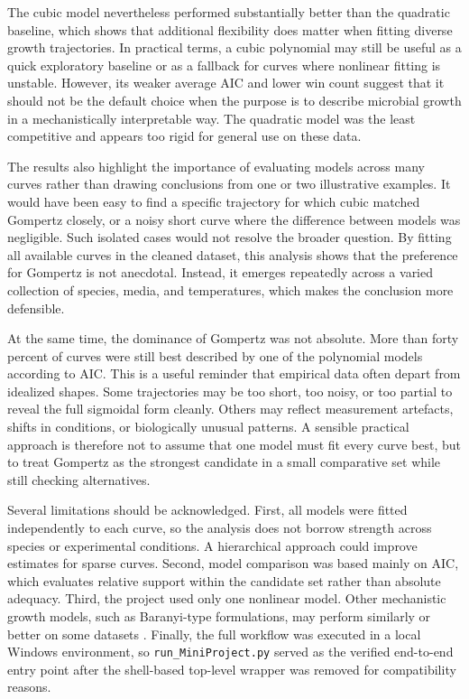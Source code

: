 \documentclass[11pt]{article}
\begin{document}
The cubic model nevertheless performed substantially better than the quadratic baseline, which shows that additional flexibility does matter when fitting diverse growth trajectories. In practical terms, a cubic polynomial may still be useful as a quick exploratory baseline or as a fallback for curves where nonlinear fitting is unstable. However, its weaker average AIC and lower win count suggest that it should not be the default choice when the purpose is to describe microbial growth in a mechanistically interpretable way. The quadratic model was the least competitive and appears too rigid for general use on these data.

The results also highlight the importance of evaluating models across many curves rather than drawing conclusions from one or two illustrative examples. It would have been easy to find a specific trajectory for which cubic matched Gompertz closely, or a noisy short curve where the difference between models was negligible. Such isolated cases would not resolve the broader question. By fitting all available curves in the cleaned dataset, this analysis shows that the preference for Gompertz is not anecdotal. Instead, it emerges repeatedly across a varied collection of species, media, and temperatures, which makes the conclusion more defensible.

At the same time, the dominance of Gompertz was not absolute. More than forty percent of curves were still best described by one of the polynomial models according to AIC. This is a useful reminder that empirical data often depart from idealized shapes. Some trajectories may be too short, too noisy, or too partial to reveal the full sigmoidal form cleanly. Others may reflect measurement artefacts, shifts in conditions, or biologically unusual patterns. A sensible practical approach is therefore not to assume that one model must fit every curve best, but to treat Gompertz as the strongest candidate in a small comparative set while still checking alternatives.

Several limitations should be acknowledged. First, all models were fitted independently to each curve, so the analysis does not borrow strength across species or experimental conditions. A hierarchical approach could improve estimates for sparse curves. Second, model comparison was based mainly on AIC, which evaluates relative support within the candidate set rather than absolute adequacy. Third, the project used only one nonlinear model. Other mechanistic growth models, such as Baranyi-type formulations, may perform similarly or better on some datasets \citep{Baranyi1994}. Finally, the full workflow was executed in a local Windows environment, so \texttt{run\_MiniProject.py} served as the verified end-to-end entry point after the shell-based top-level wrapper was removed for compatibility reasons.
\end{document}

